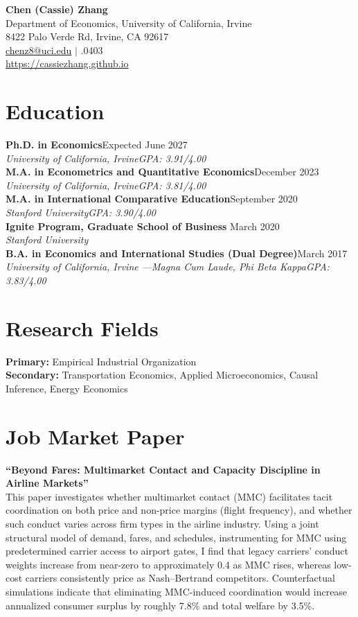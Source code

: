 \documentclass[11pt,letterpaper]{article}
\newcommand{\entry}[4]{
  \textbf{#1}\hfill #2\\
  \textit{#3}\hfill\textit{#4}\\[2pt]
}
\begin{document}
\begin{center}
{\LARGE\textbf{Chen (Cassie) Zhang}}\\[6pt]
Department of Economics, University of California, Irvine\\
8422 Palo Verde Rd, Irvine, CA 92617\\[3pt]
\href{mailto:chenz8@uci.edu}{chenz8@uci.edu} \quad $\vert$ .0403\\[3pt]
\href{https://cassiezhang.github.io}{https://cassiezhang.github.io}
\end{center}

\section{Education}
\entry{Ph.D. in Economics}{Expected June 2027}{University of California, Irvine}{GPA: 3.91/4.00}
\entry{M.A. in Econometrics and Quantitative Economics}{December 2023}{University of California, Irvine}{GPA: 3.81/4.00}
\entry{M.A. in International Comparative Education}{September 2020}{Stanford University}{GPA: 3.90/4.00}
\textbf{Ignite Program, Graduate School of Business} \hfill March 2020\\
\textit{Stanford University}\\[4pt]
\entry{B.A. in Economics and International Studies (Dual Degree)}{March 2017}{University of California, Irvine \quad\textnormal{---}\quad \textit{Magna Cum Laude, Phi Beta Kappa}}{GPA: 3.83/4.00}

\section{Research Fields}
\textbf{Primary:} Empirical Industrial Organization\\
\textbf{Secondary:} Transportation Economics, Applied Microeconomics, Causal Inference, Energy Economics

\section{Job Market Paper}
\textbf{``Beyond Fares: Multimarket Contact and Capacity Discipline in Airline Markets''}\\[3pt]
This paper investigates whether multimarket contact (MMC) facilitates tacit coordination on both price and non-price margins (flight frequency), and whether such conduct varies across firm types in the airline industry. Using a joint structural model of demand, fares, and schedules, instrumenting for MMC using predetermined carrier access to airport gates, I find that legacy carriers' conduct weights increase from near-zero to approximately 0.4 as MMC rises, whereas low-cost carriers consistently price as Nash--Bertrand competitors. Counterfactual simulations indicate that eliminating MMC-induced coordination would increase annualized consumer surplus by roughly 7.8\% and total welfare by 3.5\%.
\end{document}
